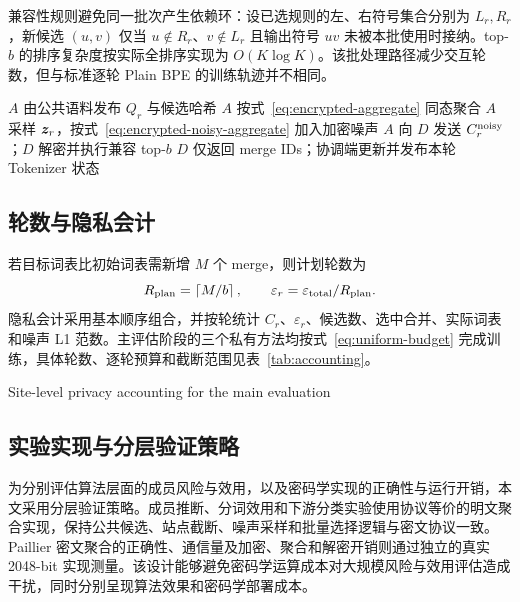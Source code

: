 兼容性规则避免同一批次产生依赖环：设已选规则的左、右符号集合分别为 $L_r,R_r$，新候选 $(u,v)$ 仅当 $u\notin R_r$、$v\notin L_r$ 且输出符号 $uv$ 未被本批使用时接纳。top-$b$ 的排序复杂度按实际全排序实现为 $O(K\log K)$。该批处理路径减少交互轮数，但与标准逐轮 Plain BPE 的训练轨迹并不相同。

\renewcommand{\algorithmcfname}{\normalfont\kaishu\zihao{-5} 算法}
\SetAlgoCaptionSeparator{~}
\begin{algorithm}[t]
\caption{\kaishu{} SA-DP-BPE 单轮训练协议}
\label{alg:protocol}
$A$ 由公共语料发布 $Q_r$ 与候选哈希\;
$A$ 按式~\eqref{eq:encrypted-aggregate} 同态聚合\;
$A$ 采样 $\bm{z}_r$，按式~\eqref{eq:encrypted-noisy-aggregate} 加入加密噪声\;
$A$ 向 $D$ 发送 $C^{\rm noisy}_r$；$D$ 解密并执行兼容 top-$b$\;
$D$ 仅返回 merge IDs；协调端更新并发布本轮 Tokenizer 状态\;
\end{algorithm}

\subsection{轮数与隐私会计}

若目标词表比初始词表需新增 $M$ 个 merge，则计划轮数为
\begin{equation}
 R_{\rm plan}=\left\lceil M/b\right\rceil,
 \qquad \varepsilon_r=\varepsilon_{\rm total}/R_{\rm plan}.
 \label{eq:uniform-budget}
\end{equation}
隐私会计采用基本顺序组合，并按轮统计 $C_r$、$\varepsilon_r$、候选数、选中合并、实际词表和噪声 L1 范数。主评估阶段的三个私有方法均按式~\eqref{eq:uniform-budget} 完成训练，具体轮数、逐轮预算和截断范围见表~\ref{tab:accounting}。

\begin{table}
\centering
\caption{主评估配置的站点级隐私会计}{Site-level privacy accounting for the main evaluation}
\label{tab:accounting}
\resizebox{\linewidth}{!}{}
\end{table}

\subsection{实验实现与分层验证策略}

为分别评估算法层面的成员风险与效用，以及密码学实现的正确性与运行开销，本文采用分层验证策略。成员推断、分词效用和下游分类实验使用协议等价的明文聚合实现，保持公共候选、站点截断、噪声采样和批量选择逻辑与密文协议一致。Paillier 密文聚合的正确性、通信量及加密、聚合和解密开销则通过独立的真实 2048-bit 实现测量。该设计能够避免密码学运算成本对大规模风险与效用评估造成干扰，同时分别呈现算法效果和密码学部署成本。
